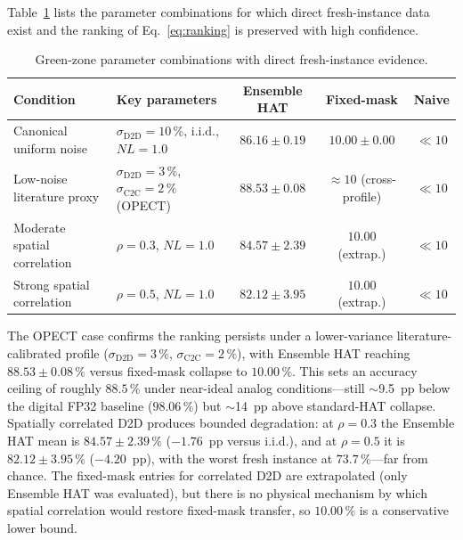 Table~\ref{tab:green-zone} lists the parameter combinations for which direct fresh-instance data exist and the ranking of Eq.~\ref{eq:ranking} is preserved with high confidence.

\begin{table}[t]
    \centering
    \caption{Green-zone parameter combinations with direct fresh-instance evidence.}
    \label{tab:green-zone}
    \small
    \begin{tabularx}{\textwidth}{@{}>{\raggedright\arraybackslash}X>{\raggedright\arraybackslash}Xccc@{}}
        \toprule
        \textbf{Condition} & \textbf{Key parameters} & \textbf{Ensemble HAT} & \textbf{Fixed-mask} & \textbf{Naive} \\
        \midrule
        Canonical uniform noise & $\sigma_{\mathrm{D2D}}=10\,\%$, i.i.d., $NL=1.0$ & $86.16\pm0.19$ & $10.00\pm0.00$ & $\ll 10$ \\
        Low-noise literature proxy & $\sigma_{\mathrm{D2D}}=3\,\%$, $\sigma_{\mathrm{C2C}}=2\,\%$ (OPECT) & $88.53\pm0.08$ & $\approx 10$ (cross-profile) & $\ll 10$ \\
        Moderate spatial correlation & $\rho=0.3$, $NL=1.0$ & $84.57\pm2.39$ & $10.00$ (extrap.) & $\ll 10$ \\
        Strong spatial correlation & $\rho=0.5$, $NL=1.0$ & $82.12\pm3.95$ & $10.00$ (extrap.) & $\ll 10$ \\
        \bottomrule
    \end{tabularx}
\end{table}

The OPECT case confirms the ranking persists under a lower-variance literature-calibrated profile ($\sigma_{\mathrm{D2D}}=3\,\%$, $\sigma_{\mathrm{C2C}}=2\,\%$), with Ensemble HAT reaching $88.53\pm0.08\,\%$ versus fixed-mask collapse to $10.00\,\%$.  This sets an accuracy ceiling of roughly $88.5\,\%$ under near-ideal analog conditions---still $\sim$9.5~pp below the digital FP32 baseline ($98.06\,\%$) but $\sim$14~pp above standard-HAT collapse.  Spatially correlated D2D produces bounded degradation: at $\rho=0.3$ the Ensemble HAT mean is $84.57\pm2.39\,\%$ ($-1.76$~pp versus i.i.d.), and at $\rho=0.5$ it is $82.12\pm3.95\,\%$ ($-4.20$~pp), with the worst fresh instance at $73.7\,\%$---far from chance.  The fixed-mask entries for correlated D2D are extrapolated (only Ensemble HAT was evaluated), but there is no physical mechanism by which spatial correlation would restore fixed-mask transfer, so $10.00\,\%$ is a conservative lower bound.


